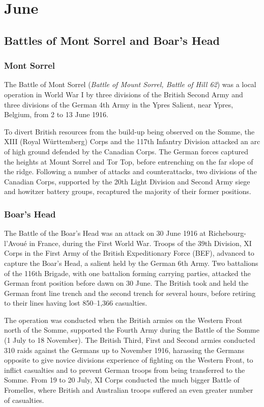 \documentclass[a4paper,]{book}
\begin{document}
\chapter{June}

\section{Battles of Mont Sorrel and Boar's Head}

\subsection{Mont Sorrel}

The Battle of Mont Sorrel (\textit{Battle of Mount Sorrel, Battle of Hill 62}) was a local operation in World War I by three divisions of the British Second Army and three divisions of the German 4th Army in the Ypres Salient, near Ypres, Belgium, from 2 to 13 June 1916.

To divert British resources from the build-up being observed on the Somme, the XIII (Royal Württemberg) Corps and the 117th Infantry Division attacked an arc of high ground defended by the Canadian Corps. The German forces captured the heights at Mount Sorrel and Tor Top, before entrenching on the far slope of the ridge. Following a number of attacks and counterattacks, two divisions of the Canadian Corps, supported by the 20th Light Division and Second Army siege and howitzer battery groups, recaptured the majority of their former positions. 

\subsection{Boar's Head}

The Battle of the Boar's Head was an attack on 30 June 1916 at Richebourg-l'Avoué in France, during the First World War. Troops of the 39th Division, XI Corps in the First Army of the British Expeditionary Force (BEF), advanced to capture the Boar's Head, a salient held by the German 6th Army. Two battalions of the 116th Brigade, with one battalion forming carrying parties, attacked the German front position before dawn on 30 June. The British took and held the German front line trench and the second trench for several hours, before retiring to their lines having lost 850–1,366 casualties.

The operation was conducted when the British armies on the Western Front north of the Somme, supported the Fourth Army during the Battle of the Somme (1 July to 18 November). The British Third, First and Second armies conducted 310 raids against the Germans up to November 1916, harassing the Germans opposite to give novice divisions experience of fighting on the Western Front, to inflict casualties and to prevent German troops from being transferred to the Somme. From 19 to 20 July, XI Corps conducted the much bigger Battle of Fromelles, where British and Australian troops suffered an even greater number of casualties.
\end{document}
